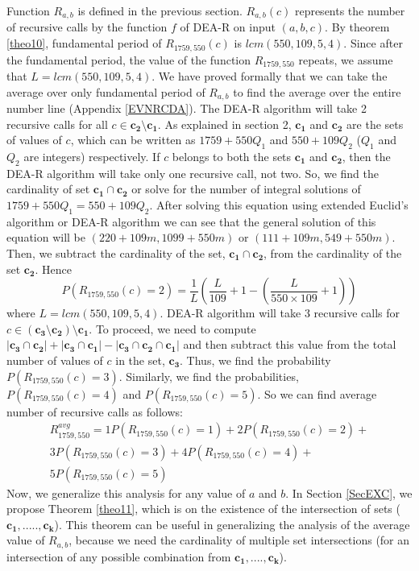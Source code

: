 \documentclass[pdflatex,sn-mathphys-num]{sn-jnl}%
\theoremstyle{thmstyleone}%
\theoremstyle{thmstyletwo}%
\theoremstyle{thmstylethree}%
\begin{document}
Function $R_{a,b}$ is defined in the previous section. $R_{a,b}(c)$  represents the number of recursive calls by the function $f$ of DEA-R on input $(a,b,c)$. 
 By theorem \ref{theo10}, fundamental period of $R_{1759,550}(c)$ is $lcm(550,109,5,4)$. Since after the fundamental period, the value of the function $R_{1759,550}$ repeats, we assume that $L=lcm(550,109,5,4)$. We have  proved formally that we can take the average over only fundamental period of $R_{a,b}$ to find the average over the entire number line (Appendix \ref{EVNRCDA}).
The DEA-R algorithm will take 2 recursive calls for all $c \in \mathbf{c_2}\setminus \mathbf{c_1}$. As explained in section 2, $\mathbf{c_1}$ and $\mathbf{c_2}$ are the sets of values of $c$, which can be written as $1759+550Q_1$ and $550+109Q_2$ ($Q_1$ and $Q_2$ are integers) respectively. If $c$ belongs to both the sets $\mathbf{c_1}$ and $\mathbf{c_2}$, then the DEA-R algorithm will take only one recursive call, not two. So, we find the cardinality of set $\mathbf{c_1}\cap \mathbf{c_2}$ or solve for the number of integral solutions of $1759+550Q_1=550+109Q_2$. After solving this equation using extended Euclid's algorithm or DEA-R algorithm we can see that the general solution of this equation will be $(220+109m,1099+550m)$ or $(111+109m,549+550m)$. Then, we subtract the cardinality of the set, $\mathbf{c_1} \cap \mathbf{c_2}$, from the cardinality of the set $\mathbf{c_2}$. Hence
$$P(R_{1759,550}(c)=2)=\frac{1}{L}\left(\frac{L}{109}+1-\left(\frac{L}{550\times 109}+1\right)\right)$$ 
where $L=lcm(550,109,5,4)$.
DEA-R algorithm will take 3 recursive calls for $c \in (\mathbf{c_3}\setminus \mathbf{c_2}) \setminus \mathbf{c_1}$. To proceed, we need to compute $|\mathbf{c_3} \cap \mathbf{c_2}| + |\mathbf{c_3}\cap \mathbf{c_1}|-|\mathbf{c_3}\cap \mathbf{c_2}\cap\mathbf{c_1}|$ and then subtract this value from the total number of values of $c$ in the set, $\mathbf{c_3}$. Thus, we find the probability
$P(R_{1759,550}(c)=3)$. Similarly, we find the probabilities, $P(R_{1759,550}(c)=4)$ and $P(R_{1759,550}(c)=5)$. So we can find average number of recursive calls as follows:\begin{multline}R_{1759,550}^{avg}=1P(R_{1759,550}(c)=1)+2P(R_{1759,550}(c)=2)+\\3P(R_{1759,550}(c)=3)+4P(R_{1759,550}(c)=4)+\\5P(R_{1759,550}(c)=5)\end{multline}
Now, we generalize this analysis for any value of $a$ and $b$. In Section \ref{SecEXC}, we propose Theorem \ref{theo11}, which is on the existence of the intersection of sets ($\mathbf{c_1},.....,\mathbf{c_k}$). This theorem can be useful in generalizing the analysis of the average value of $R_{a,b}$, because we need the cardinality of multiple set intersections (for an intersection of any possible combination from $\mathbf{c_1},....,\mathbf{c_k}$).
\end{document}
